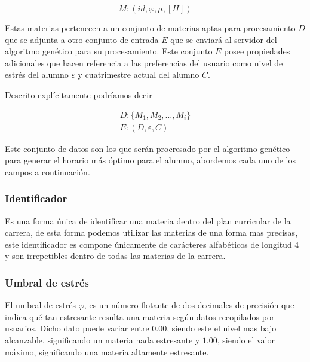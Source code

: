 \begin{equation}
    M: (id, \varphi, \mu, [H])
    \label{definicion_de_materia_apta_para_procesamiento.}
\end{equation} 

Estas materias pertenecen a un conjunto de materias aptas para procesamiento $D$ que se adjunta a otro conjunto de entrada $E$ que se enviará al servidor del algoritmo genético para su procesamiento. Este conjunto $E$ posee propiedades adicionales que hacen referencia a las preferencias del usuario como nivel de estrés del alumno $\varepsilon$ y cuatrimestre actual del alumno $C$.

Descrito explícitamente podríamos decir

\begin{equation}
    \begin{split}
        D: \{ M_1, M_2, \dots, M_i \} \\
        E: (D, \varepsilon, C)
    \end{split}
    \label{definiciones_de_datos_de_entrada.}
\end{equation} 

Este conjunto de datos son los que serán procresado por el algoritmo genético para generar el horario más óptimo para el alumno, abordemos cada uno de los campos a continuación.

\subsubsection{Identificador}
Es una forma única de identificar una materia dentro del plan curricular de la carrera, de esta forma podemos utilizar las materias de una forma mas precisas, este identificador es compone únicamente de carácteres alfabéticos de longitud 4 y son irrepetibles dentro de todas las materias de la carrera.

\subsubsection{Umbral de estrés}
El umbral de estrés $\varphi$, es un número flotante de dos decimales de precisión que indica qué tan estresante resulta una materia según datos recopilados por usuarios. Dicho dato puede variar entre $0.00$, siendo este el nivel mas bajo alcanzable, significando un materia nada estresante y $1.00$, siendo el valor máximo, significando una materia altamente estresante.

